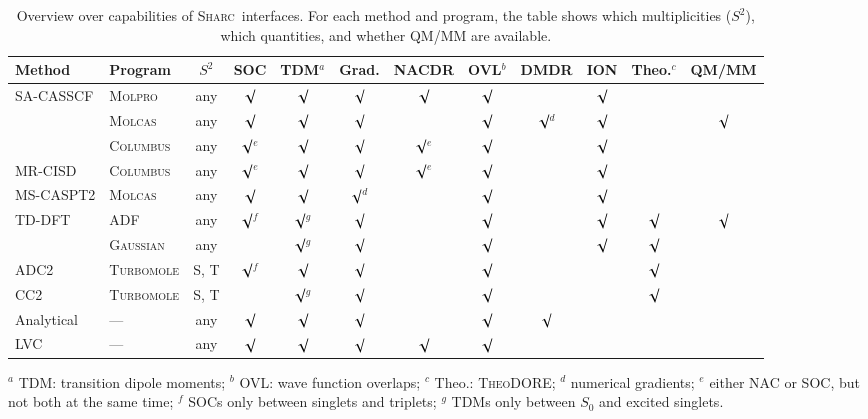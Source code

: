 \documentclass[a4paper,10pt,DIV=15,openany,twoside=false]{scrbook}
\newcommand{\sharc}{\textsc{Sharc}}
\begin{document}
\begin{table}[htb]
  \newcommand{\chk}{\ensuremath{\surd}}
  \centering
  \caption{Overview over capabilities of \sharc\ interfaces. For each method and program, the table shows which multiplicities ($S^2$), which quantities, and whether QM/MM are available.}
  \label{tab:interfaces}
  \begin{tabular}{ll cccccccccc}
    \hline
    Method      &Program              &$S^2$   &SOC         &TDM$^a$     &Grad.       &NACDR       &OVL$^b$ &DMDR     &ION  &Theo.$^c$   &QM/MM\\
    \hline
    SA-CASSCF   &\textsc{Molpro}      &any     &\chk        &\chk        &\chk        &\chk        &\chk    &         &\chk &            &     \\
                &\textsc{Molcas}      &any     &\chk        &\chk        &\chk        &            &\chk    &\chk$^d$ &\chk &            &\chk \\
                &\textsc{Columbus}    &any     &\chk$^e$    &\chk        &\chk        &\chk$^e$    &\chk    &         &\chk &            &     \\
    MR-CISD     &\textsc{Columbus}    &any     &\chk$^e$    &\chk        &\chk        &\chk$^e$    &\chk    &         &\chk &            &     \\
    MS-CASPT2   &\textsc{Molcas}      &any     &\chk        &\chk        &\chk$^d$    &            &\chk    &         &\chk &            &     \\
    TD-DFT      &\textsc{ADF}         &any     &\chk$^f$    &\chk$^g$    &\chk        &            &\chk    &         &\chk &\chk        &\chk \\
                &\textsc{Gaussian}    &any     &            &\chk$^g$    &\chk        &            &\chk    &         &\chk &\chk        &     \\
    ADC2        &\textsc{Turbomole}   &S, T    &\chk$^f$    &\chk        &\chk        &            &\chk    &         &     &\chk        &     \\
    CC2         &\textsc{Turbomole}   &S, T    &            &\chk$^g$    &\chk        &            &\chk    &         &     &\chk        &     \\
    Analytical  &---                  &any     &\chk        &\chk        &\chk        &            &\chk    &\chk     &     &            &     \\
    LVC         &---                  &any     &\chk        &\chk        &\chk        &\chk        &\chk    &         &     &            &     \\
    \hline
  \end{tabular}

  $^a$ TDM: transition dipole moments;
  $^b$ OVL: wave function overlaps;
  $^c$ Theo.: \textsc{TheoDORE};
  $^d$ numerical gradients;
  $^e$ either NAC or SOC, but not both at the same time;
  $^f$ SOCs only between singlets and triplets;
  $^g$ TDMs only between $S_0$ and excited singlets.
\end{table}
\end{document}
